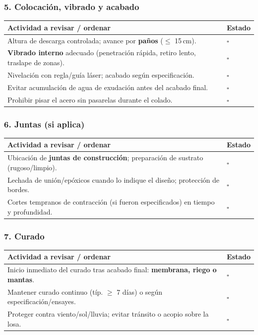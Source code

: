 \documentclass[12pt]{article}
\newcommand{\cbox}{\(\square\)}
\renewcommand{\cbox}{\(\square\)} %
\begin{document}
 \subsubsection*{5. Colocación, vibrado y acabado}
 \begin{tabularx}{\linewidth}{>{\raggedright\arraybackslash}p{0.93\linewidth} >{\centering\arraybackslash}m{0.07\linewidth}}
 	\toprule
 	\textbf{Actividad a revisar / ordenar} & \textbf{Estado}\\
 	\midrule
 	Altura de descarga controlada; avance por \textbf{paños} (\(\leq\) 15\,cm). & \cbox \\
 	\textbf{Vibrado interno} adecuado (penetración rápida, retiro lento, traslape de zonas). & \cbox \\
 	Nivelación con regla/guía láser; acabado según especificación. & \cbox \\
 	Evitar acumulación de agua de exudación antes del acabado final. & \cbox \\
 	Prohibir pisar el acero sin pasarelas durante el colado. & \cbox \\
 	\bottomrule
 \end{tabularx}
 
 \subsubsection*{6. Juntas (si aplica)}
 \begin{tabularx}{\linewidth}{>{\raggedright\arraybackslash}p{0.93\linewidth} >{\centering\arraybackslash}m{0.07\linewidth}}
 	\toprule
 	\textbf{Actividad a revisar / ordenar} & \textbf{Estado}\\
 	\midrule
 	Ubicación de \textbf{juntas de construcción}; preparación de sustrato (rugoso/limpio). & \cbox \\
 	Lechada de unión/epóxicos cuando lo indique el diseño; protección de bordes. & \cbox \\
 	Cortes tempranos de contracción (si fueron especificados) en tiempo y profundidad. & \cbox \\
 	\bottomrule
 \end{tabularx}
 
 \subsubsection*{7. Curado}
 \begin{tabularx}{\linewidth}{>{\raggedright\arraybackslash}p{0.93\linewidth} >{\centering\arraybackslash}m{0.07\linewidth}}
 	\toprule
 	\textbf{Actividad a revisar / ordenar} & \textbf{Estado}\\
 	\midrule
 	Inicio inmediato del curado tras acabado final: \textbf{membrana, riego o mantas}. & \cbox \\
 	Mantener curado continuo (típ. \(\geq\) 7 días) o según especificación/ensayes. & \cbox \\
 	Proteger contra viento/sol/lluvia; evitar tránsito o acopio sobre la losa. & \cbox \\
 	\bottomrule
 \end{tabularx}
 
\end{document}
